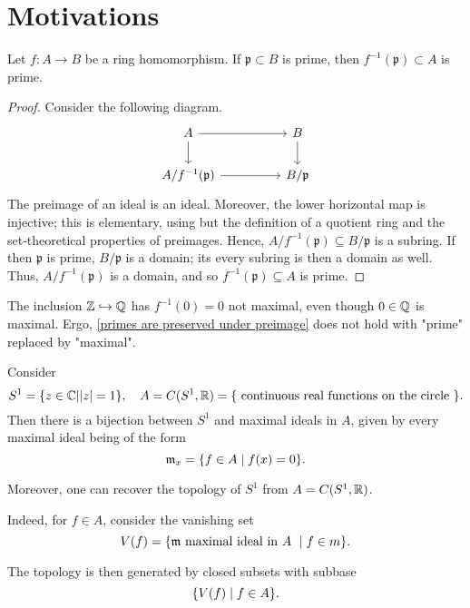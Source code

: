 \section{Motivations}

\begin{lemma}
  \label{primes are preserved under preimage}
  Let $f:A \to B$ be a ring homomorphism. If $\mathfrak p \subset B$ is prime, then $f^{-1}(\mathfrak p) \subset A$ is prime.
\end{lemma}

\begin{proof}
  Consider the following diagram.
  \begin{equation*}
  \begin{tikzcd}[column sep = huge]
    A \arrow[r] \arrow[d]
    & B \arrow[d] \\
    A /{ f^{-1}(\mathfrak p) } \arrow[r]
    & B /{\mathfrak p}
  \end{tikzcd}
  \end{equation*}
The preimage of an ideal is an ideal. Moreover, the lower horizontal map is injective; this is elementary, using but the definition of a quotient ring and the set-theoretical properties of preimages. Hence,
  $A /{f^{-1}(\mathfrak p)} \subseteq B /{\mathfrak p}$
  is a subring. If then $\mathfrak p$ is prime, $B /{\mathfrak p}$ is a domain; its every subring is then a domain as well. Thus,
$A / {f^{-1}(\mathfrak p)}$
is a domain, and so
$f^{-1}(\mathfrak p) \subseteq A$
is prime.
\end{proof}

\begin{example}
The inclusion $\mathbb Z \hookrightarrow \mathbb Q$ has $f^{-1}(0) = 0$ not maximal, even though $0 \in \mathbb Q$ is maximal.
Ergo, \cref{primes are preserved under preimage} does not hold with "prime" replaced by "maximal".
\end{example}

\begin{example}
  \label{mot-circle}
  Consider
  \[ S^1 = \{ z \in \mathbb C | |z|=1 \}, \quad A = C(S^1, \mathbb R) = \{ \text{ continuous real functions on the circle } \}.\]
  Then there is a bijection between $S^1$ and maximal ideals in $A$, given by every maximal ideal being of the form
  \[\mathfrak m_x = \{ f \in A \mathrel{|} f(x) = 0 \} .\]

  Moreover, one can recover the topology of $S^1$ from $A = C(S^1, \mathbb R)$.

  Indeed, for $f \in A$, consider the vanishing set
  \[ V(f) = \{ \mathfrak m \text{ maximal ideal in $A$ } \mathrel{|} f \in m \}.\]

  The topology is then generated by closed subsets with subbase
  \[\{V(f) \mathrel{|} f \in A\}.\]
\end{example}

